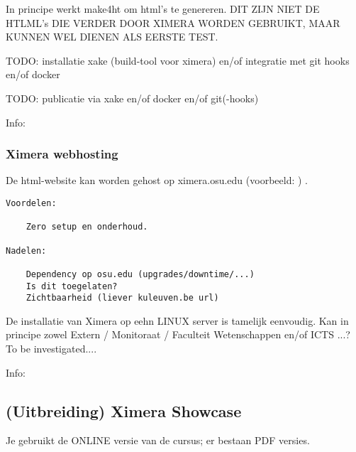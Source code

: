 \documentclass{ximera}
\begin{document}
In principe werkt make4ht om html's te genereren. DIT ZIJN NIET DE HTLML's DIE VERDER DOOR XIMERA WORDEN GEBRUIKT, MAAR KUNNEN WEL DIENEN ALS EERSTE TEST.


TODO: installatie xake   (build-tool voor ximera) en/of integratie met git hooks en/of docker

TODO: publicatie via xake en/of docker en/of git(-hooks)


Info: 

\subsubsection{Ximera webhosting}

De html-website kan worden gehost op ximera.osu.edu  (voorbeeld: ) . 

\begin{verbatim}
Voordelen:

    Zero setup en onderhoud.

Nadelen:

    Dependency op osu.edu (upgrades/downtime/...)
    Is dit toegelaten?
    Zichtbaarheid (liever kuleuven.be url)

\end{verbatim}

De installatie van Ximera op eehn LINUX server is tamelijk eenvoudig. Kan in principe zowel Extern / Monitoraat / Faculteit Wetenschappen en/of ICTS ...? To be investigated....
    
Info: 

\subsection{(Uitbreiding) Ximera Showcase}


\begin{onlineOnly}
    Je gebruikt de ONLINE versie van de cursus; er bestaan PDF versies.
\end{onlineOnly}
\end{document}
